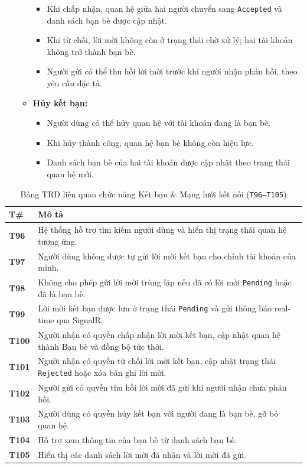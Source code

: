 \documentclass[11pt,a4paper]{article}
\begin{document}
\begin{itemize}[leftmargin=1.2cm, noitemsep]
\begin{itemize}[leftmargin=0.8cm, label=$\ast$, noitemsep]
\begin{itemize}[leftmargin=0.6cm, label=$\circ$, noitemsep]
            \item Khi chấp nhận, quan hệ giữa hai người chuyển sang \texttt{Accepted} và danh sách bạn bè được cập nhật.
            \item Khi từ chối, lời mời không còn ở trạng thái chờ xử lý; hai tài khoản không trở thành bạn bè.
            \item Người gửi có thể thu hồi lời mời trước khi người nhận phản hồi, theo yêu cầu đặc tả.
        \end{itemize}
        \item \textbf{Hủy kết bạn:}
        \begin{itemize}[leftmargin=0.6cm, label=$\circ$, noitemsep]
            \item Người dùng có thể hủy quan hệ với tài khoản đang là bạn bè.
            \item Khi hủy thành công, quan hệ bạn bè không còn hiệu lực.
            \item Danh sách bạn bè của hai tài khoản được cập nhật theo trạng thái quan hệ mới.
        \end{itemize}
    \end{itemize}
\end{itemize}

\begin{table}[H]
\centering
\small
\begin{tabularx}{\textwidth}{|C{1.5cm}|X|}
\hline
{}
\textbf{T\#} & \textbf{Mô tả} \tabularnewline
\hline
\textbf{T96} & Hệ thống hỗ trợ tìm kiếm người dùng và hiển thị trạng thái quan hệ tương ứng. \\ \hline
\textbf{T97} & Người dùng không được tự gửi lời mời kết bạn cho chính tài khoản của mình. \\ \hline
\textbf{T98} & Không cho phép gửi lời mời trùng lặp nếu đã có lời mời \texttt{Pending} hoặc đã là bạn bè. \\ \hline
\textbf{T99} & Lời mời kết bạn được lưu ở trạng thái \texttt{Pending} và gửi thông báo real-time qua SignalR. \\ \hline
\textbf{T100} & Người nhận có quyền chấp nhận lời mời kết bạn, cập nhật quan hệ thành Bạn bè và đồng bộ tức thời. \\ \hline
\textbf{T101} & Người nhận có quyền từ chối lời mời kết bạn, cập nhật trạng thái \texttt{Rejected} hoặc xóa bản ghi lời mời. \\ \hline
\textbf{T102} & Người gửi có quyền thu hồi lời mời đã gửi khi người nhận chưa phản hồi. \\ \hline
\textbf{T103} & Người dùng có quyền hủy kết bạn với người đang là bạn bè, gỡ bỏ quan hệ. \\ \hline
\textbf{T104} & Hỗ trợ xem thông tin của bạn bè từ danh sách bạn bè. \\ \hline
\textbf{T105} & Hiển thị các danh sách lời mời đã nhận và lời mời đã gửi. \\ \hline
\end{tabularx}
\caption{Bảng TRD liên quan chức năng Kết bạn \& Mạng lưới kết nối (\texttt{T96--T105})}
\end{table}
\end{document}
